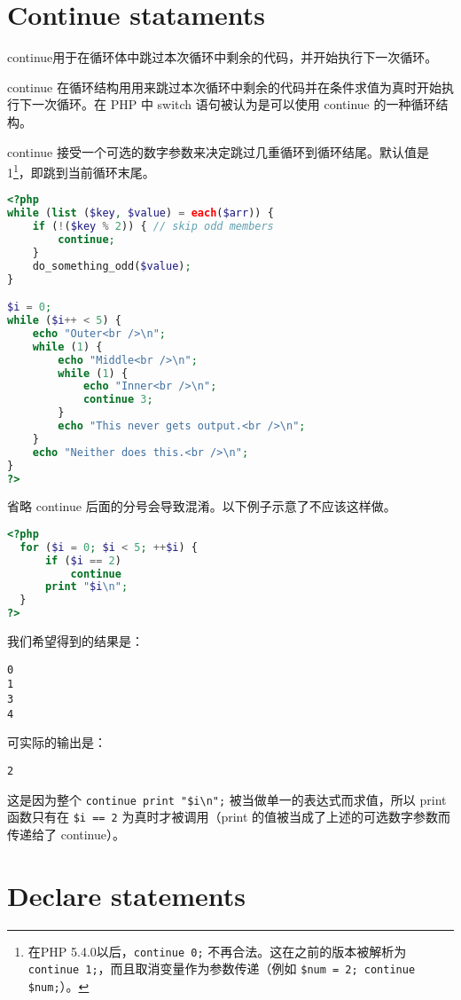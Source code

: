 \section{Continue stataments}


continue用于在循环体中跳过本次循环中剩余的代码，并开始执行下一次循环。



continue 在循环结构用用来跳过本次循环中剩余的代码并在条件求值为真时开始执行下一次循环。在 PHP 中 switch 语句被认为是可以使用 continue 的一种循环结构。

continue 接受一个可选的数字参数来决定跳过几重循环到循环结尾。默认值是 1\footnote{在PHP 5.4.0以后，\texttt{continue 0;} 不再合法。这在之前的版本被解析为 \texttt{continue 1;}，而且取消变量作为参数传递（例如 \texttt{\$num = 2; continue \$num;}）。}，即跳到当前循环末尾。

\begin{lstlisting}[language=PHP]
<?php
while (list ($key, $value) = each($arr)) {
    if (!($key % 2)) { // skip odd members
        continue;
    }
    do_something_odd($value);
}

$i = 0;
while ($i++ < 5) {
    echo "Outer<br />\n";
    while (1) {
        echo "Middle<br />\n";
        while (1) {
            echo "Inner<br />\n";
            continue 3;
        }
        echo "This never gets output.<br />\n";
    }
    echo "Neither does this.<br />\n";
}
?>
\end{lstlisting}

省略 continue 后面的分号会导致混淆。以下例子示意了不应该这样做。

\begin{lstlisting}[language=PHP]
<?php
  for ($i = 0; $i < 5; ++$i) {
      if ($i == 2)
          continue
      print "$i\n";
  }
?>
\end{lstlisting}

我们希望得到的结果是：

\begin{verbatim}
0
1
3
4
\end{verbatim}

可实际的输出是：

\begin{verbatim}
2
\end{verbatim}

这是因为整个 \texttt{continue print "\$i\textbackslash n";} 被当做单一的表达式而求值，所以 print 函数只有在 \texttt{\$i == 2} 为真时才被调用（print 的值被当成了上述的可选数字参数而传递给了 continue）。


\section{Declare statements}

